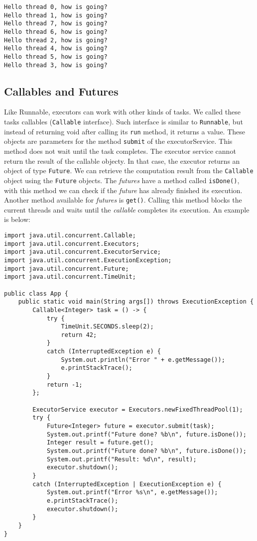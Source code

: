 \documentclass{latex/classes/myarticle}
\begin{document}
\begin{verbatim}
Hello thread 0, how is going?
Hello thread 1, how is going?
Hello thread 7, how is going?
Hello thread 6, how is going?
Hello thread 2, how is going?
Hello thread 4, how is going?
Hello thread 5, how is going?
Hello thread 3, how is going?
\end{verbatim}

\subsection{Callables and Futures}
\label{sec:org1ff468c}

Like Runnable, executors can work with other kinds of tasks. We called these
tasks callables (\texttt{Callable} interface). Such interface is similar to \texttt{Runnable},
but instead of returning void after calling its \texttt{run} method, it returns a
value. These objects are parameters for the method \texttt{submit} of the
executorService. This method does not wait until the task completes. The
executor service cannot return the result of the callable objecty. In that
case, the executor returns an object of type \texttt{Future}. We can retrieve the
computation result from the \texttt{Callable} object using the \texttt{Future} objects. The
\emph{futures} have a method called \texttt{isDone()}, with this method we can check if the
\emph{future} has already finished its execution. Another method available for
\emph{futures} is \texttt{get()}. Calling this method blocks the current threads and waits
until the \emph{callable} completes its execution. An example is below:


\begin{lstlisting}
import java.util.concurrent.Callable;
import java.util.concurrent.Executors;
import java.util.concurrent.ExecutorService;
import java.util.concurrent.ExecutionException;
import java.util.concurrent.Future;
import java.util.concurrent.TimeUnit;

public class App {
    public static void main(String args[]) throws ExecutionException {
        Callable<Integer> task = () -> {
            try {
                TimeUnit.SECONDS.sleep(2);
                return 42;
            }
            catch (InterruptedException e) {
                System.out.println("Error " + e.getMessage());
                e.printStackTrace();
            }
            return -1;
        };

        ExecutorService executor = Executors.newFixedThreadPool(1);
        try {
            Future<Integer> future = executor.submit(task);
            System.out.printf("Future done? %b\n", future.isDone());
            Integer result = future.get();
            System.out.printf("Future done? %b\n", future.isDone());
            System.out.printf("Result: %d\n", result);
            executor.shutdown();
        }
        catch (InterruptedException | ExecutionException e) {
            System.out.printf("Error %s\n", e.getMessage());
            e.printStackTrace();
            executor.shutdown();
        }
    }
}
\end{lstlisting}
\end{document}
